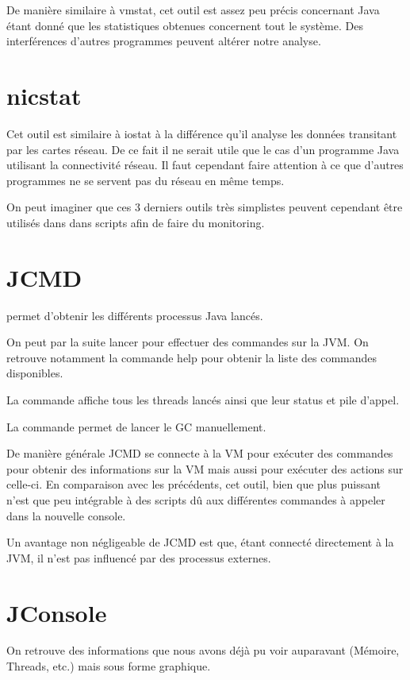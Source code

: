 \documentclass{report}
\begin{document}
			De manière similaire à vmstat, cet outil est assez peu précis concernant Java étant donné que les statistiques obtenues concernent tout le système.
			Des interférences d'autres programmes peuvent altérer notre analyse.
			
		\section{nicstat}
			Cet outil est similaire à iostat à la différence qu'il analyse les données transitant par les cartes réseau.
			De ce fait il ne serait utile que le cas d'un programme Java utilisant la connectivité réseau.
			Il faut cependant faire attention à ce que d'autres programmes ne se servent pas du réseau en même temps.
			
			
			On peut imaginer que ces 3 derniers outils très simplistes peuvent cependant être utilisés dans dans scripts afin de faire du monitoring.
			
		\section{JCMD}
			 permet d'obtenir les différents processus Java lancés.
			
			On peut par la suite lancer  pour effectuer des commandes sur la JVM.
			On retrouve notamment la commande help pour obtenir la liste des commandes disponibles.
			
			La commande  affiche tous les threads lancés ainsi que leur status et pile d'appel.
			
			La commande  permet de lancer le GC manuellement.
			
			De manière générale JCMD se connecte à la VM pour exécuter des commandes pour obtenir des informations sur la VM mais aussi pour exécuter des actions sur celle-ci.
			En comparaison avec les précédents, cet outil, bien que plus puissant n'est que peu intégrable à des scripts dû aux différentes commandes à appeler dans la nouvelle console.
			
			Un avantage non négligeable de JCMD est que, étant connecté directement à la JVM, il n'est pas influencé par des processus externes.
			
		\section{JConsole}
			On retrouve des informations que nous avons déjà pu voir auparavant (Mémoire, Threads, etc.) mais sous forme graphique.
			
\end{document}
